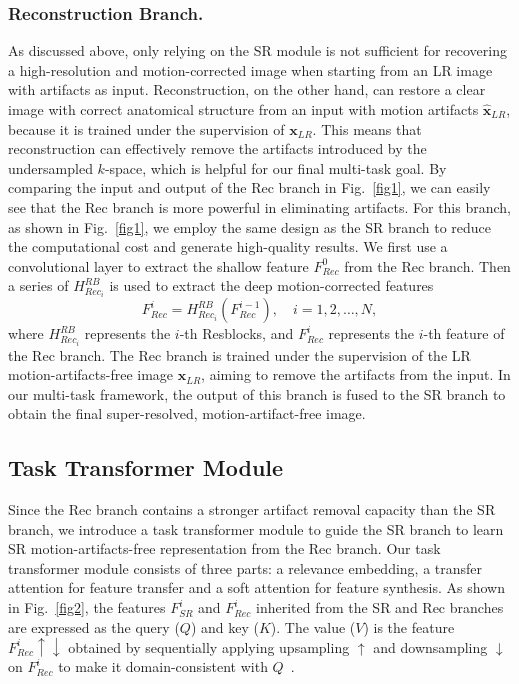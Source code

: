 \documentclass[runningheads]{llncs}
\newcommand{\figref}[1]{Fig.\!~\ref{#1}}
\begin{document}
\subsubsection{Reconstruction Branch.}
As discussed above, only relying on the SR module is not sufficient for recovering a high-resolution and motion-corrected image when starting from an LR image with artifacts as input. Reconstruction, on the other hand, can restore a clear image with correct anatomical structure from an input with motion artifacts $\hat{\mathbf{x}}_{LR}$, because it is trained under the supervision of $\mathbf{x}_{LR}$. This means that reconstruction can effectively remove the artifacts introduced by the undersampled $k$-space, which is helpful for our final multi-task goal. By comparing the input and output of the Rec branch in \figref{fig1}, we can easily see that the Rec branch is more powerful in eliminating artifacts. For this branch, as shown in \figref{fig1}, we employ the same design as the SR branch to reduce the computational cost and generate high-quality results. We first use a convolutional layer to extract the shallow feature $F^{0}_{Rec}$ from the Rec branch. Then a series of $H^{RB}_{Rec_{i}}$ is used to extract the deep motion-corrected features
\begin{equation}\label{eq:rec}
F^{i}_{Rec}=H^{RB}_{Rec_{i}}\left(F^{i-1}_{Rec}\right), \quad i=1,2, \ldots, N,
\end{equation}
where $H^{RB}_{Rec_{i}}$ represents the $i$-th Resblocks, and $F^{i}_{Rec}$ represents the $i$-th feature of the Rec branch. The Rec branch is trained under the supervision of the LR motion-artifacts-free image ${\mathbf{x}}_{LR}$, aiming to remove the artifacts from the input. In our multi-task framework, the output of this branch is fused to the SR branch to obtain the final super-resolved, motion-artifact-free image.


\subsection{Task Transformer Module} \label{sec:tt}
Since the Rec branch contains a stronger artifact removal capacity than the SR branch, we introduce a task transformer module to guide the SR branch to learn SR motion-artifacts-free representation from the Rec branch. Our task transformer module consists of three parts: a relevance embedding, a transfer attention for feature transfer and a soft attention for feature synthesis. As shown in \figref{fig2}, the features $F^{i}_{SR}$ and $F^{i}_{Rec}$ inherited from the SR and Rec branches are expressed as the query ($Q$) and key ($K$). The value ($V$) is the feature $F^{i}_{Rec}\uparrow\downarrow$ obtained by sequentially applying upsampling $\uparrow$ and downsampling $\downarrow$ on $F^{i}_{Rec}$ to make it domain-consistent with $Q$~\cite{yang2020learning}.
\end{document}
